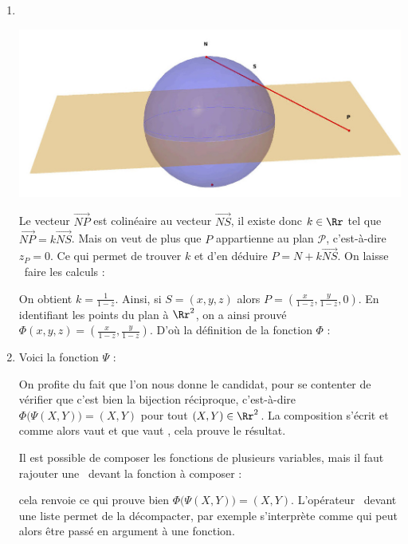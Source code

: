\documentclass[class=report,crop=false]{standalone}
\newcommand{\vect}{\overrightarrow}
\begin{document}
\begin{enumerate}
  \item ~
  

\begin{center}
  \includegraphics[scale=0.3]{figures/stereo1bis.jpg} 
\end{center}

  Le vecteur $\vect{NP}$ est colinéaire au vecteur $\vect{NS}$, il existe donc
  $k\in \Rr$ tel que  $\vect{NP} = k \vect{NS}$. Mais on veut de plus que
  $P$ appartienne au plan $\mathcal{P}$, c'est-à-dire $z_P = 0$. Ce qui permet de trouver $k$
  et d'en déduire $P = N + k\vect{NS}$. 
  On laisse \Sage\ faire les calculs :
 
  On obtient $k = \frac{1}{1-z}$. Ainsi, si $S=(x,y,z)$ alors
  $P = \left( \frac{x}{1-z}, \frac{y}{1-z}, 0 \right)$.
  En identifiant les points du plan à $\Rr^2$, on a ainsi prouvé 
  $\Phi(x,y,z) = \left( \frac{x}{1-z}, \frac{y}{1-z} \right)$.
  D'où la définition de la fonction $\Phi$ : 

  \item Voici la fonction $\Psi$ :
  
  On profite du fait que l'on nous donne le candidat, 
  pour se contenter de vérifier que c'est bien la bijection réciproque, c'est-à-dire
  $\Phi\big( \Psi(X,Y) \big) = (X,Y)$ pour tout $(X,Y) \in \Rr^2$.
  La composition s'écrit
 et comme alors  vaut  et que  vaut , cela prouve le résultat.
 
 Il est possible de composer les fonctions de plusieurs variables, mais il faut rajouter
 une \og\codeinline{*}\fg\ devant la fonction à composer :\\
 \centerline{}
 cela renvoie  ce qui prouve bien 
  $\Phi\big( \Psi(X,Y) \big) = (X,Y)$.
  L'opérateur \og\codeinline{*}\fg\ devant une liste permet de la décompacter, par exemple
    s'interprète comme  qui peut alors être passé en argument à une fonction.
  

\end{enumerate}
\end{document}
